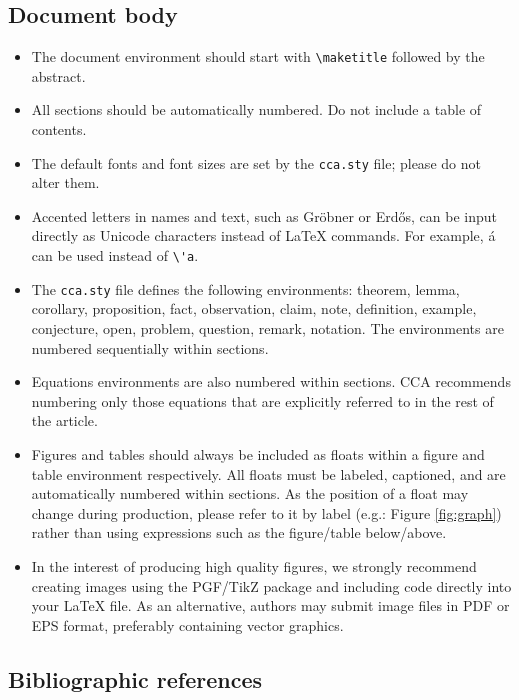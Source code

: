\documentclass[12pt]{article}
\begin{document}
\subsection{Document body}

\begin{itemize}
\item The document environment should start with \verb|\maketitle|
  followed by the abstract.
\item All sections should be automatically numbered. Do not include a
  table of contents.
\item The default fonts and font sizes are set by the \verb|cca.sty|
  file; please do not alter them.
\item Accented letters in names and text, such as Gröbner or Erdős,
  can be input directly as Unicode characters instead of LaTeX
  commands. For example, á can be used instead of \verb|\'a|.
\item The \verb|cca.sty| file defines the following environments:
  theorem, lemma, corollary, proposition, fact, observation, claim,
  note, definition, example, conjecture, open, problem, question,
  remark, notation.  The environments are numbered sequentially within
  sections.
\item Equations environments are also numbered within sections. CCA
  recommends numbering only those equations that are explicitly
  referred to in the rest of the article.
\item Figures and tables should always be included as floats within a
  figure and table environment respectively. All floats must be
  labeled, captioned, and are automatically numbered within sections.
  As the position of a float may change during production, please
  refer to it by label (e.g.: Figure \ref{fig:graph}) rather than
  using expressions such as the figure/table below/above.
\item In the interest of producing high quality figures, we strongly
  recommend creating images using the PGF/TikZ package and including
  code directly into your LaTeX file. As an alternative, authors may
  submit image files in PDF or EPS format, preferably containing
  vector graphics.
\end{itemize}


\subsection{Bibliographic references}
\end{document}

